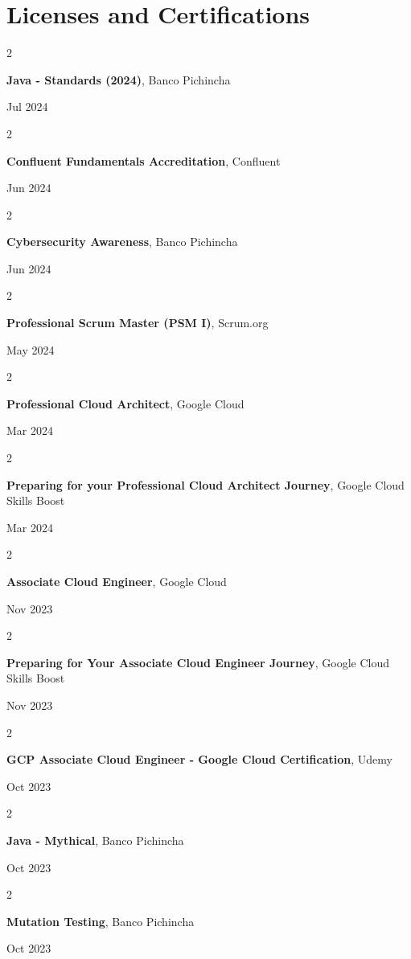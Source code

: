 \documentclass[10pt, letterpaper]{article}
\newenvironment{twocolentry}[2][]{
    \onecolentry
    \def\secondColumn{#2}
    \setcolumnwidth{\fill, 4.5 cm}
    \begin{paracol}{2}
}{
    \switchcolumn \raggedleft \secondColumn
    \end{paracol}
    \endonecolentry
} %
\begin{document}
    \section{Licenses and Certifications}
    \begin{twocolentry}{
            Jul 2024
        }
        \textbf{Java - Standards (2024)}, Banco Pichincha
    \end{twocolentry}
    \begin{twocolentry}{
            Jun 2024
        }
        \textbf{Confluent Fundamentals Accreditation}, Confluent
    \end{twocolentry}
    \begin{twocolentry}{
            Jun 2024
        }
        \textbf{Cybersecurity Awareness}, Banco Pichincha
    \end{twocolentry}
    \begin{twocolentry}{
            May 2024
        }
        \textbf{Professional Scrum Master (PSM I)}, Scrum.org
    \end{twocolentry}
    \begin{twocolentry}{
            Mar 2024
        }
        \textbf{Professional Cloud Architect}, Google Cloud
    \end{twocolentry}
    \begin{twocolentry}{
            Mar 2024
        }
        \textbf{Preparing for your Professional Cloud Architect Journey}, Google Cloud Skills Boost
    \end{twocolentry}
    \begin{twocolentry}{
            Nov 2023
        }
        \textbf{Associate Cloud Engineer}, Google Cloud
    \end{twocolentry}
    \begin{twocolentry}{
            Nov 2023
        }
        \textbf{Preparing for Your Associate Cloud Engineer Journey}, Google Cloud Skills Boost
    \end{twocolentry}
    \begin{twocolentry}{
            Oct 2023
        }
        \textbf{GCP Associate Cloud Engineer - Google Cloud Certification}, Udemy
    \end{twocolentry}
    \begin{twocolentry}{
            Oct 2023
        }
        \textbf{Java - Mythical}, Banco Pichincha
    \end{twocolentry}
    \begin{twocolentry}{
            Oct 2023
        }
        \textbf{Mutation Testing}, Banco Pichincha
    \end{twocolentry}
\end{document}
